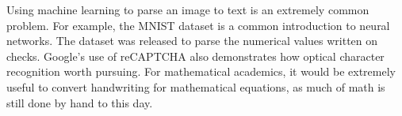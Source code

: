 \documentclass[../proposal.tex]{subfiles}
\begin{document}
Using machine learning to parse an image to text is an extremely common problem.
For example, the MNIST dataset is a common introduction to neural networks. \cite*{lecun_2010_MNIST}
The dataset was released to parse the numerical values written on checks.
Google's use of reCAPTCHA also demonstrates how optical character recognition worth pursuing. \cite*{Ahn_2008_reCAPTCHA}
For mathematical academics, it would be extremely useful to convert handwriting for mathematical equations, as much of math is still done by hand to this day.
\end{document}
